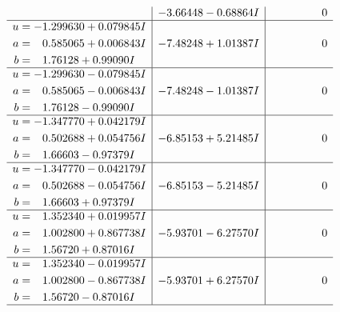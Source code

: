 \documentclass[1p]{elsarticle_modified}
\theoremstyle{definition}
\begin{document}
$$\begin{array}{c|c|c}
 & -3.66448 - 0.68864 I & \phantom{-0.000000 } 0 \\ \hline\begin{aligned}
u &= -1.299630 + 0.079845 I \\
a &= \phantom{-}0.585065 + 0.006843 I \\
b &= \phantom{-}1.76128 + 0.99090 I\end{aligned}
 & -7.48248 + 1.01387 I & \phantom{-0.000000 } 0 \\ \hline\begin{aligned}
u &= -1.299630 - 0.079845 I \\
a &= \phantom{-}0.585065 - 0.006843 I \\
b &= \phantom{-}1.76128 - 0.99090 I\end{aligned}
 & -7.48248 - 1.01387 I & \phantom{-0.000000 } 0 \\ \hline\begin{aligned}
u &= -1.347770 + 0.042179 I \\
a &= \phantom{-}0.502688 + 0.054756 I \\
b &= \phantom{-}1.66603 - 0.97379 I\end{aligned}
 & -6.85153 + 5.21485 I & \phantom{-0.000000 } 0 \\ \hline\begin{aligned}
u &= -1.347770 - 0.042179 I \\
a &= \phantom{-}0.502688 - 0.054756 I \\
b &= \phantom{-}1.66603 + 0.97379 I\end{aligned}
 & -6.85153 - 5.21485 I & \phantom{-0.000000 } 0 \\ \hline\begin{aligned}
u &= \phantom{-}1.352340 + 0.019957 I \\
a &= \phantom{-}1.002800 + 0.867738 I \\
b &= \phantom{-}1.56720 + 0.87016 I\end{aligned}
 & -5.93701 - 6.27570 I & \phantom{-0.000000 } 0 \\ \hline\begin{aligned}
u &= \phantom{-}1.352340 - 0.019957 I \\
a &= \phantom{-}1.002800 - 0.867738 I \\
b &= \phantom{-}1.56720 - 0.87016 I\end{aligned}
 & -5.93701 + 6.27570 I & \phantom{-0.000000 } 0\\
 \hline 
 \end{array}$$\newpage$$\begin{array}{c|c|c}  

\end{array}$$
\end{document}
